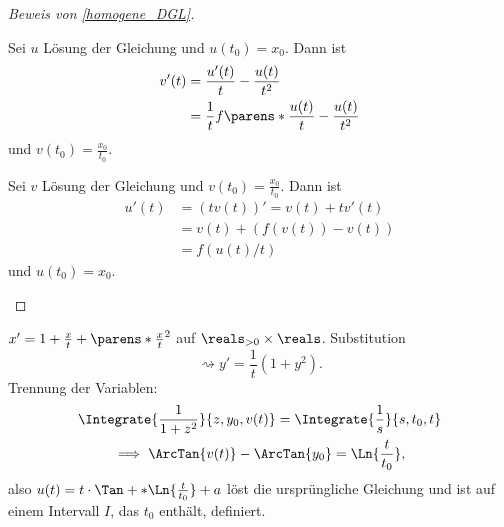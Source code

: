 \begin{proof}[Beweis von \ref{homogene_DGL}]
  \begin{proofdescription}
    \item[\hin] Sei \( u \) Lösung der  Gleichung und \( u(t_0)=x_0 \). Dann ist 
    \begin{align*}
      v'(t)&=\frac{u'(t)}{t}-\frac{u(t)}{t^2}\\
      &=\frac{1}{t}f\parens*{\frac{u(t)}{t}}-\frac{u(t)}{t^2}
    \end{align*}
    und \( v(t_0)=\frac{x_0}{t_0} \).
    \item[\rueck] Sei \( v \) Lösung der  Gleichung und \( v(t_0)=\frac{x_0}{t_0} \). Dann ist
    \begin{align*}
      u'(t)&=(t v(t))'=v(t)+t v'(t)\\
      &=v(t)+(f(v(t))-v(t))\\
      &=f(u(t)/t)
    \end{align*}
    und \( u(t_0)=x_0 \).
  \end{proofdescription}
  
\end{proof}
\begin{beispiel*}
  \( x'=1+\frac{x}{t}+\parens*{\frac{x}{t}}^2 \) auf \( \reals_{>0}\times \reals \). Substitution
  \begin{equation*}
    \rightsquigarrow y'=\frac{1}{t}(1+y^2).
  \end{equation*}
  Trennung der Variablen:
  \begin{gather*}
    \Integrate{\frac{1}{1+z^2}}{z,y_0,v(t)}=\Integrate{\frac{1}{s}}{s,t_0,t}\\
    \implies\ArcTan{v(t)}-\ArcTan{y_0}=\Ln{\frac{t}{t_0}},
  \end{gather*}
  also \( u(t)=t\cdot \Tan+*{\Ln{\frac{t}{t_0}}+a} \) löst die ursprüngliche Gleichung und ist auf einem Intervall \( I \), das \( t_0 \) enthält, definiert.
\end{beispiel*}
